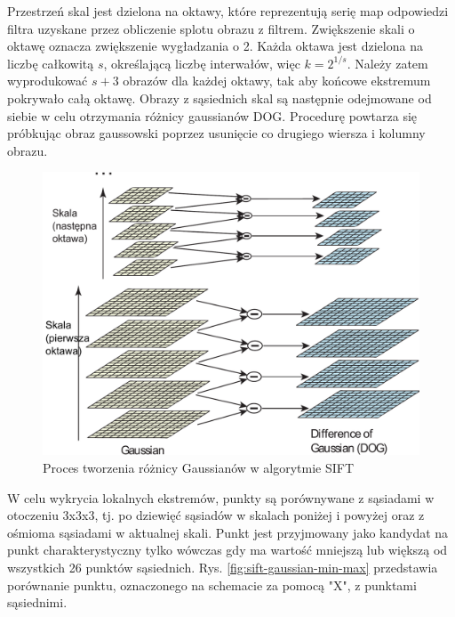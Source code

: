 Przestrzeń skal jest dzielona na oktawy, które reprezentują serię map odpowiedzi filtra uzyskane przez obliczenie splotu obrazu z filtrem. Zwiększenie skali o oktawę oznacza zwiększenie wygładzania o 2. Każda oktawa jest dzielona na liczbę całkowitą $s$, określającą liczbę interwałów, więc $k=2^{1/s}$. Należy zatem wyprodukować $s+3$ obrazów dla każdej oktawy, tak aby końcowe ekstremum pokrywało całą oktawę. Obrazy z sąsiednich skal są następnie odejmowane od siebie w celu otrzymania różnicy gaussianów DOG. Procedurę powtarza się próbkując obraz gaussowski poprzez usunięcie co drugiego wiersza i kolumny obrazu.\cite{LOWE04}

\begin{figure}[h]
	\centering
	\includegraphics[scale=0.4]{graphics/01_podstawy_teoretyczne/sift-gaussian-to-dog.pdf}
	\caption{Proces tworzenia różnicy Gaussianów w algorytmie SIFT \cite{LOWE04}}
	\label{fig:sift-gaussian-to-dog}
\end{figure}

W celu wykrycia lokalnych ekstremów, punkty są porównywane z sąsiadami w otoczeniu 3x3x3, tj. po dziewięć sąsiadów w skalach poniżej i powyżej oraz z ośmioma sąsiadami w aktualnej skali. Punkt jest przyjmowany jako kandydat na punkt charakterystyczny tylko wówczas gdy ma wartość mniejszą lub większą od wszystkich 26 punktów sąsiednich.\cite{LOWE04} Rys. \ref{fig:sift-gaussian-min-max} przedstawia porównanie punktu, oznaczonego na schemacie za pomocą "X", z punktami sąsiednimi.

